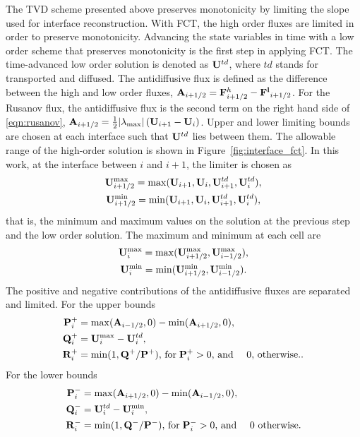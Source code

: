 The TVD scheme presented above preserves monotonicity by limiting the slope used for interface reconstruction.  With FCT, the high order fluxes are limited in order to preserve monotonicity.  Advancing the state variables in time with a low order scheme that preserves monotonicity is the first step in applying FCT.  The time-advanced low order solution is denoted as $\mathbf{U}^{td}$, where $td$ stands for transported and diffused.  The antidiffusive flux is defined as the difference between the high and low order fluxes, $\mathbf{A}_{i+1/2} = \mathbf{F}^{h}_{i+1/2} - \mathbf{F^{l}}_{i+1/2}$.  For the Rusanov flux, the antidiffusive flux is the second term on the right hand side of \eqref{eqn:rusanov}, $\mathbf{A}_{i+1/2} = \frac{1}{2}|\lambda_{\max}|\left(\mathbf{U}_{i+1} - \mathbf{U}_{i} \right)$.  Upper and lower limiting bounds are chosen at each interface such that $\mathbf{U}^{td}$ lies between them.  The allowable range of the high-order solution is shown in Figure~\ref{fig:interface_fct}.  In this work, at the interface between $i$ and $i+1$, the limiter is chosen as
\begin{gather}
\label{eqn:fct_limit_max}
\mathbf{U}^{\max}_{i+1/2} = \max(\mathbf{U}_{i+1},\mathbf{U}_{i},\mathbf{U}^{td}_{i+1},\mathbf{U}^{td}_{i}) , \\
\label{eqn:fct_limit_min}
\mathbf{U}^{\min}_{i+1/2} = \min(\mathbf{U}_{i+1},\mathbf{U}_{i},\mathbf{U}^{td}_{i+1},\mathbf{U}^{td}_{i}) , 
\end{gather}   
that is, the minimum and maximum values on the solution at the previous step and the low order solution.  The maximum and minimum at each cell are 
\begin{gather}
\mathbf{U}^{\max}_{i} = \max(\mathbf{U}^{\max}_{i+1/2},\mathbf{U}^{\max}_{i-1/2}) , \\
\mathbf{U}^{\min}_{i} = \min(\mathbf{U}^{\min}_{i+1/2},\mathbf{U}^{\min}_{i-1/2}) .
\end{gather}   
The positive and negative contributions of the antidiffusive fluxes are separated and limited.  For the upper bounds
\begin{align}
\mathbf{P}^+_i &= \max(\mathbf{A}_{i-1/2},0) - \min(\mathbf{A}_{i+1/2},0) , \\
\mathbf{Q}^+_i &= \mathbf{U}^{\max}_i - \mathbf{U}^{td}_i , \\
\mathbf{R}^+_i &= \min(1,\mathbf{Q}^+/\mathbf{P}^+) \text{, for} \; \mathbf{P}^+_i > 0 \text{, and } \quad 0 \text{, otherwise.}.
\end{align}
For the lower bounds
\begin{align}
\mathbf{P}^-_i &= \max(\mathbf{A}_{i+1/2},0) - \min(\mathbf{A}_{i-1/2},0) , \\
\mathbf{Q}^-_i &= \mathbf{U}^{td}_i - \mathbf{U}^{\min}_i , \\
\mathbf{R}^-_i &= \min(1,\mathbf{Q}^-/\mathbf{P}^-) \text{, for} \; \mathbf{P}^-_i > 0 \text{, and } \quad 0 \text{ otherwise.}
\end{align}
